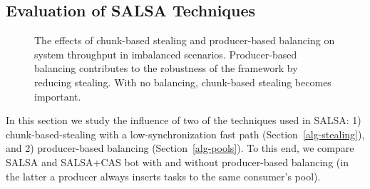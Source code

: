 \subsection{Evaluation of SALSA Techniques}
\label{sec:eval-techniques}
\begin{figure}[htb]
	\centering
	\caption{\footnotesize{The effects of chunk-based stealing and producer-based balancing on system throughput in imbalanced scenarios. Producer-based balancing contributes to the robustness of the framework by reducing stealing. With no balancing, chunk-based stealing becomes important. }}
	\label{fig:1-n-salsa}
\end{figure}
In this section we study the influence of two of the techniques used in SALSA: 1) chunk-based-stealing with a low-synchronization fast path (Section~\ref{alg-stealing}), and 2) producer-based balancing (Section~\ref{alg-pools}). 
To this end, we compare SALSA and SALSA+CAS bot with and without producer-based balancing (in the latter a producer always inserts tasks to the same consumer's pool).

